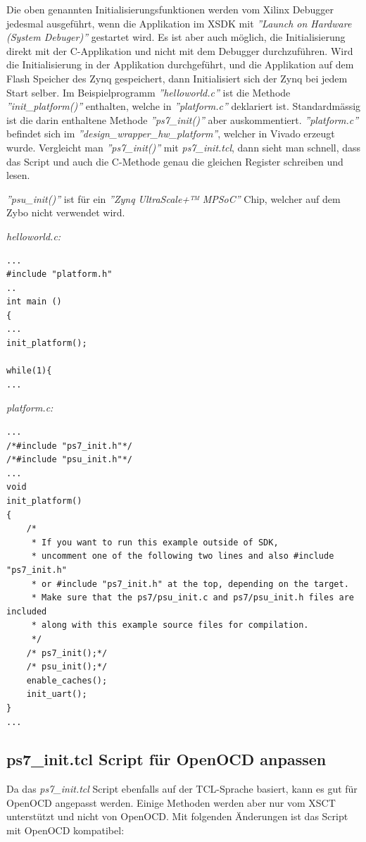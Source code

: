 Die oben genannten Initialisierungsfunktionen werden vom Xilinx Debugger jedesmal ausgeführt, wenn die Applikation im XSDK mit \textit{''Launch on Hardware (System Debuger)''} gestartet wird.
Es ist aber auch möglich, die Initialisierung direkt mit der C-Applikation und nicht mit dem Debugger durchzuführen.
Wird die Initialisierung in der Applikation durchgeführt, und die Applikation auf dem Flash Speicher des Zynq gespeichert, dann Initialisiert sich der Zynq bei jedem Start selber.
Im Beispielprogramm \textit{''helloworld.c''} ist die Methode \textit{''init\_platform()''} enthalten, welche in \textit{''platform.c''} deklariert ist.
Standardmässig ist die darin enthaltene Methode \textit{''ps7\_init()''} aber auskommentiert.
\textit{''platform.c''} befindet sich im \textit{''design\_wrapper\_hw\_platform''}, welcher in Vivado erzeugt wurde.
Vergleicht man \textit{''ps7\_init()''} mit \textit{ps7\_init.tcl}, dann sieht man schnell, dass das Script und auch die C-Methode genau die gleichen Register schreiben und lesen.

\textit{''psu\_init()''} ist für ein \textit{''Zynq UltraScale+™ MPSoC''} Chip, welcher auf dem Zybo nicht verwendet wird.


\textit{helloworld.c:}
\lstset{language=c}
\begin{lstlisting}[frame=single]
...
#include "platform.h"
..
int main ()
{
...
init_platform();

while(1){
...
\end{lstlisting}



\textit{platform.c:}
\lstset{language=c}
\begin{lstlisting}[frame=single]
...
/*#include "ps7_init.h"*/
/*#include "psu_init.h"*/
...
void
init_platform()
{
    /*
     * If you want to run this example outside of SDK,
     * uncomment one of the following two lines and also #include "ps7_init.h"
     * or #include "ps7_init.h" at the top, depending on the target.
     * Make sure that the ps7/psu_init.c and ps7/psu_init.h files are included
     * along with this example source files for compilation.
     */
    /* ps7_init();*/
    /* psu_init();*/
    enable_caches();
    init_uart();
}
...

\end{lstlisting}




\subsection{ps7\_init.tcl Script für OpenOCD anpassen}
Da das \textit{ps7\_init.tcl} Script ebenfalls auf der TCL-Sprache basiert, kann es gut für OpenOCD angepasst werden.
Einige Methoden werden aber nur vom XSCT unterstützt und nicht von OpenOCD.
Mit folgenden Änderungen ist das Script mit OpenOCD kompatibel:

